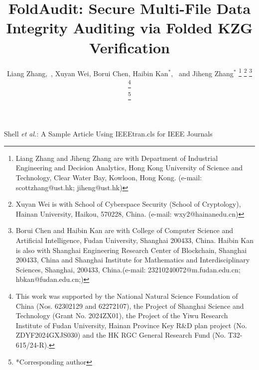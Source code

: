\documentclass[lettersize,journal]{IEEEtran}
\begin{document}
\title{FoldAudit: Secure Multi-File Data Integrity Auditing via Folded KZG Verification}

%
{Shell \MakeLowercase{\textit{et al.}}: A Sample Article Using IEEEtran.cls for IEEE Journals}

\author{Liang Zhang,~, Xuyan Wei, Borui Chen, Haibin Kan$^*$,~ and Jiheng Zhang$^*$
\thanks{Liang Zhang and Jiheng Zhang are with Department of Industrial Engineering and Decision Analytics, Hong Kong University of Science and Technology, Clear Water Bay, Kowloon, Hong Kong. (e-mail: scottzhang@ust.hk; jiheng@ust.hk)}
\thanks{Xuyan Wei is with School of Cyberspace Security (School of Cryptology), Hainan University, Haikou, 570228, China. (e-mail: wxy2@hainanedu.cn)}
\thanks{Borui Chen and Haibin Kan are with College of Computer Science and Artificial Intelligence, Fudan University, Shanghai 200433, China. Haibin Kan is also with Shanghai Engineering Research Center of Blockchain, Shanghai 200433, China and Shanghai Institute for Mathematics and Interdisciplinary Sciences, Shanghai, 200433, China.(e-mail: 23210240072@m.fudan.edu.cn; hbkan@fudan.edu.cn;)}

\thanks{This work was supported by the National Natural Science Foundation of China (Nos. 62302129 and 62272107), the Project of Shanghai Science and Technology (Grant No. 2024ZX01), the Project of the Yiwu Research Institute of Fudan University, Hainan Province Key R\&D plan project (No. ZDYF2024GXJS030) and the HK RGC General Research Fund (No. T32-615/24-R).}

\thanks{*Corresponding author}
}
\end{document}
